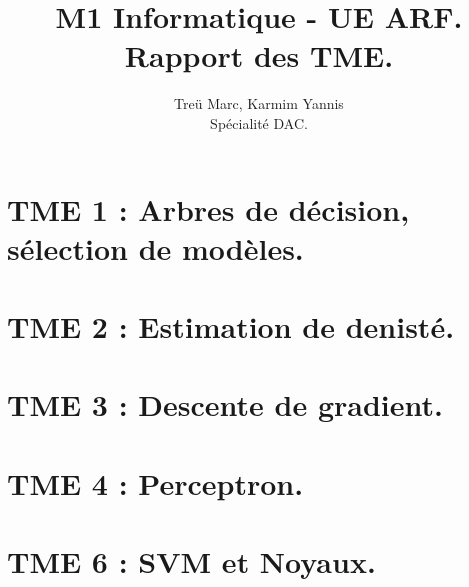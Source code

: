 \documentclass{article}
\title{M1 Informatique - UE ARF.\\Rapport des TME.}
\author{Treü Marc, Karmim Yannis\\Spécialité DAC.}
\begin{document}
\maketitle
\clearpage
\tableofcontents
\clearpage

\section{TME 1 : Arbres de décision, sélection de modèles.}


\section{TME 2 : Estimation de denisté.}
\section{TME 3 : Descente de gradient.}
\section{TME 4 : Perceptron.}
\section{TME 6 : SVM et Noyaux.}
\end{document}
